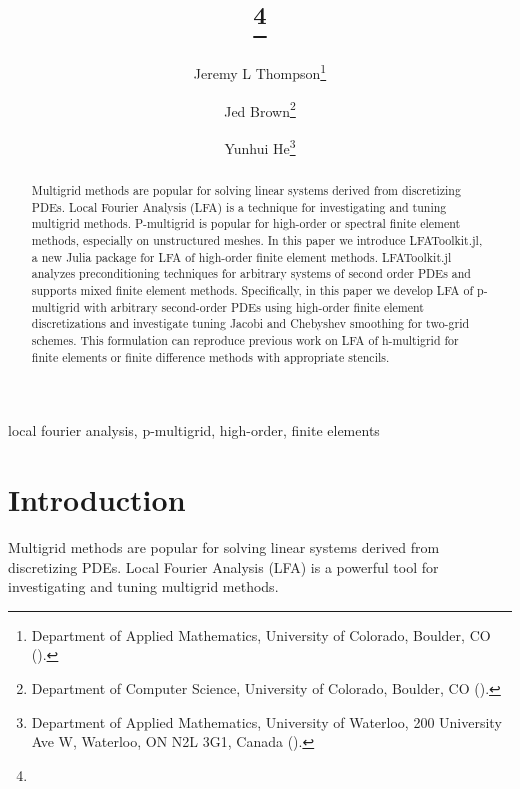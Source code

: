 \documentclass[review]{siamart190516}
\author{
Jeremy L Thompson\thanks{Department of Applied Mathematics, University of Colorado, Boulder, CO
  (\email{jeremy@jeremylt.org}).}
\and Jed Brown\thanks{Department of Computer Science, University of Colorado, Boulder, CO
  (\email{jed@jedbrown.org}).}
\and Yunhui He\thanks{Department of Applied Mathematics,
University of Waterloo, 200 University Ave W, Waterloo, ON N2L 3G1, Canada
  (\email{yunhui.he@uwaterloo.ca}).}
}
\title{{\TheTitle}\thanks{\TheFunding}}
\begin{document}
\maketitle

\vspace{1cm}

\begin{abstract}
Multigrid methods are popular for solving linear systems derived from discretizing PDEs.
Local Fourier Analysis (LFA) is a technique for investigating and tuning multigrid methods.
P-multigrid is popular for high-order or spectral finite element methods, especially on unstructured meshes.
In this paper we introduce LFAToolkit.jl, a new Julia package for LFA of high-order finite element methods.
LFAToolkit.jl analyzes preconditioning techniques for arbitrary systems of second order PDEs and supports mixed finite element methods.
Specifically, in this paper we develop LFA of p-multigrid with arbitrary second-order PDEs using high-order finite element discretizations and investigate tuning Jacobi and Chebyshev smoothing for two-grid schemes.
This formulation can reproduce previous work on LFA of h-multigrid for finite elements or finite difference methods with appropriate stencils.
\end{abstract}

\begin{keywords}
  local fourier analysis, p-multigrid, high-order, finite elements
\end{keywords}

\section{Introduction}\label{sec:intro}

Multigrid methods \cite{brandt1982guide, briggs2000multigrid, stuben1982multigrid} are popular for solving linear systems derived from discretizing PDEs.
Local Fourier Analysis (LFA) \cite{brandt1977multi, wienands2004practical} is a powerful tool for investigating and tuning multigrid methods.
\end{document}
